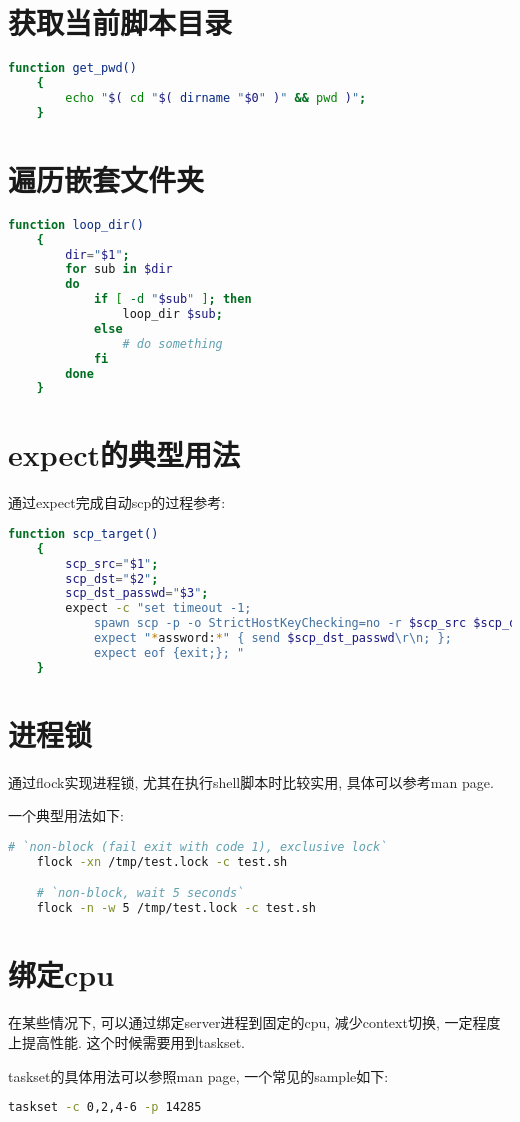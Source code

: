 \section {\ZHH 获取当前脚本目录} {
    \begin{lstlisting}[language=bash]
    function get_pwd()
    {
        echo "$( cd "$( dirname "$0" )" && pwd )";
    }
    \end{lstlisting}
}


\section {\ZHH 遍历嵌套文件夹} {
    \begin{lstlisting}[language=bash]
    function loop_dir()
    {
        dir="$1";
        for sub in $dir
        do
            if [ -d "$sub" ]; then
                loop_dir $sub;
            else
                # do something
            fi
        done
    }
    \end{lstlisting}
}


\section {\ZHH expect的典型用法} {
    {通过expect完成自动scp的过程参考: }\par
    \begin{lstlisting}[language=bash]
    function scp_target()
    {
        scp_src="$1";
        scp_dst="$2";
        scp_dst_passwd="$3";
        expect -c "set timeout -1;
            spawn scp -p -o StrictHostKeyChecking=no -r $scp_src $scp_dst;
            expect "*assword:*" { send $scp_dst_passwd\r\n; }; 
            expect eof {exit;}; "
    }
    \end{lstlisting}
}

\section {\ZHH 进程锁} {
    {通过flock实现进程锁, 尤其在执行shell脚本时比较实用, 具体可以参考man page. }\par
    {一个典型用法如下: }\par
    \begin{lstlisting}[language=bash]
    # `non-block (fail exit with code 1), exclusive lock`
    flock -xn /tmp/test.lock -c test.sh

    # `non-block, wait 5 seconds`
    flock -n -w 5 /tmp/test.lock -c test.sh
    \end{lstlisting}
}

\section {\ZHH 绑定cpu} {
    {在某些情况下, 可以通过绑定server进程到固定的cpu, 减少context切换, 一定程度上提高性能. 这个时候需要用到taskset.}\par
    {taskset的具体用法可以参照man page, 一个常见的sample如下: }\par
    \begin{lstlisting}[language=bash]
    taskset -c 0,2,4-6 -p 14285
    \end{lstlisting}\par
}


